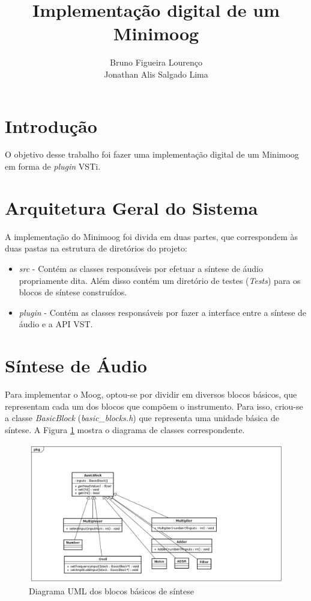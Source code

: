 \documentclass{article}
\title{Implementação digital de um Minimoog}
\author{Bruno Figueira Lourenço \\ Jonathan Alis Salgado Lima}
\begin{document}
\maketitle

\section{Introdução}
O objetivo desse trabalho foi fazer uma implementação digital de um Minimoog em forma de \emph{plugin} VSTi.



\section{Arquitetura Geral do Sistema}
A implementação do Minimoog foi divida em duas partes, que correspondem às 
duas pastas na estrutura de diretórios do projeto:

\begin{itemize}
	\item \emph{src} - Contém as classes responsáveis por efetuar 
	a síntese de áudio propriamente dita. Além disso contém um diretório 
	de testes (\emph{Tests}) para os blocos de síntese construídos.
	\item \emph{plugin} - Contém as classes responsáveis por fazer a 
	interface entre a síntese de áudio e a API VST.
\end{itemize}

\section{Síntese de Áudio}
Para implementar o Moog, optou-se por dividir em diversos blocos básicos, 
que representam cada um dos blocos que compõem o instrumento. Para isso, 
criou-se a classe \emph{BasicBlock} (\emph{basic\_blocks.h}) que representa 
uma unidade básica de síntese. A Figura \ref{fig:uml1} mostra o diagrama 
de classes correspondente.

\begin{figure}
\centering
\includegraphics[scale=0.4]{Classes.png}\caption{Diagrama UML dos blocos básicos de síntese}\label{fig:uml1}
\end{figure}
\end{document}
